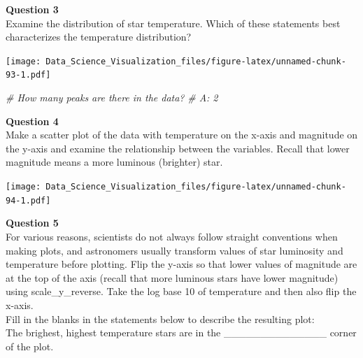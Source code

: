 \documentclass[
]{article}
\newenvironment{Shaded}{\begin{snugshade}}{\end{snugshade}}
\newcommand{\CommentTok}[1]{\textcolor[rgb]{0.56,0.35,0.01}{\textit{#1}}}
\newcommand{\DataTypeTok}[1]{\textcolor[rgb]{0.13,0.29,0.53}{#1}}
\newcommand{\KeywordTok}[1]{\textcolor[rgb]{0.13,0.29,0.53}{\textbf{#1}}}
\newcommand{\NormalTok}[1]{#1}
\newcommand{\OperatorTok}[1]{\textcolor[rgb]{0.81,0.36,0.00}{\textbf{#1}}}
\newcommand{\StringTok}[1]{\textcolor[rgb]{0.31,0.60,0.02}{#1}}
\begin{document}
\textbf{Question 3}\\
Examine the distribution of star temperature. Which of these statements
best characterizes the temperature distribution?

\begin{Shaded}
\end{Shaded}

\texttt{[image: Data\_Science\_Visualization\_files/figure-latex/unnamed-chunk-93-1.pdf]}

\begin{Shaded}
\begin{Highlighting}[]
\CommentTok{# How many peaks are there in the data?}
\CommentTok{# A: 2}
\end{Highlighting}
\end{Shaded}

\textbf{Question 4}\\
Make a scatter plot of the data with temperature on the x-axis and
magnitude on the y-axis and examine the relationship between the
variables. Recall that lower magnitude means a more luminous (brighter)
star.

\begin{Shaded}
\end{Shaded}

\texttt{[image: Data\_Science\_Visualization\_files/figure-latex/unnamed-chunk-94-1.pdf]}

\textbf{Question 5}\\
For various reasons, scientists do not always follow straight
conventions when making plots, and astronomers usually transform values
of star luminosity and temperature before plotting. Flip the y-axis so
that lower values of magnitude are at the top of the axis (recall that
more luminous stars have lower magnitude) using scale\_y\_reverse. Take
the log base 10 of temperature and then also flip the x-axis.\\
Fill in the blanks in the statements below to describe the resulting
plot:\\
The brighest, highest temperature stars are in the
\_\_\_\_\_\_\_\_\_\_\_\_\_\_ corner of the plot.
\end{document}
